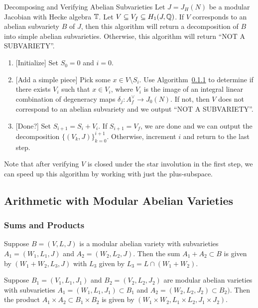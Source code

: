 \documentclass{article}
\begin{document}
\begin{algorithm}{Decomposing and Verifying Abelian Subvarieties}
    \label{alg:decomp_and_verify_subvarieties}
    Let $J=J_H(N)$ be a modular Jacobian with Hecke algebra $\mathbb{T}$. Let
    $V\subseteq V_f \subseteq H_1(J, \mathbb{Q})$. If $V$ corresponds to an abelian
    subvariety $B$ of $J$, then this algorithm will return a decomposition of
    $B$ into simple abelian subvarieties. Otherwise, this algorithm will return
    ``NOT A SUBVARIETY''.
    \begin{enumerate}
        \item{} [Initialize]
            Set $S_0=0$ and $i=0$.
        \item{} [Add a simple piece]
            Pick some $x\in V\setminus S_i$. Use Algorithm~\ref{} to determine
            if there exists $V_i$ such that $x\in V_i$, where $V_i$ is the
            image of an integral linear combination of degeneracy maps
            $\delta_j:A_f ^\vee\to J_0(N)$. If not, then $V$ does not
            correspond to an abelian subvariety and we output ``NOT A
            SUBVARIETY''.
        \item{} [Done?]
            Set $S_{i+1}=S_i + V_i$. If $S_{i+1} = V_f$, we are done and we can
            output the decomposition $\{(V_k, J)\}_{k=0} ^{i+1}$. Otherwise,
            increment $i$ and return to the last step.
    \end{enumerate}
\end{algorithm}

Note that after verifying $V$ is closed under the star involution in the first
step, we can speed up this algorithm by working with just the plus-subspace. 

\subsection{Arithmetic with Modular Abelian Varieties}

\subsubsection{Sums and Products}

Suppose $B=(V, L, J)$ is a modular abelian variety with subvarieties $A_1=(W_1,
L_1, J)$ and $A_2=(W_2, L_2, J)$. Then the sum $A_1+A_2\subset B$ is given by
$(W_1+W_2, L_3, J)$ with $L_3$ given by $L_3 = L\cap (W_1+W_2)$.

Suppose $B_1=(V_1, L_1, J_1)$ and $B_2=(V_2, L_2, J_2)$ are modular abelian
varieties with subvarieties $A_1=(W_1, L_1, J_1)\subset B_1$ and $A_2=(W_2,
L_2, J_2)\subset B_2)$. Then the product $A_1\times A_2\subset B_1\times
B_2$ is given by $(W_1\times W_2, L_1\times L_2, J_1\times J_2)$.
\end{document}
